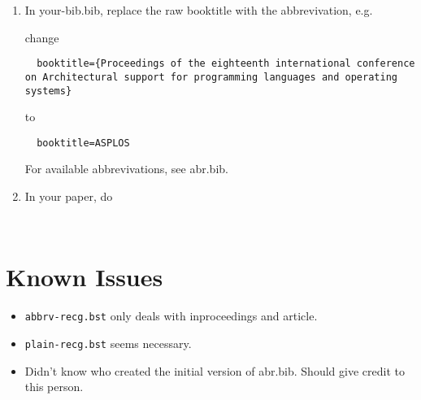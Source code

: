 \documentclass[letterpaper,11pt]{article}
\begin{document}
\begin{enumerate}
\item 
In your-bib.bib, replace the raw booktitle with the abbrevivation, e.g.

change

\begin{lstlisting}
  booktitle={Proceedings of the eighteenth international conference on Architectural support for programming languages and operating systems}
\end{lstlisting}  

to 

\begin{lstlisting}
  booktitle=ASPLOS
\end{lstlisting}  

For available abbrevivations, see abr.bib.

\item 
In your paper, do 

\begin{lstlisting}


\end{lstlisting}

\end{enumerate}


  

\section{Known Issues}

\begin{itemize}
\item 
	\texttt{abbrv-recg.bst} only deals with inproceedings and article. 
\item 
	\texttt{plain-recg.bst} seems necessary.
\item 
	Didn't know who created the initial version of abr.bib. Should give credit to this person. 
\end{itemize}


%
%


%

\end{document}
